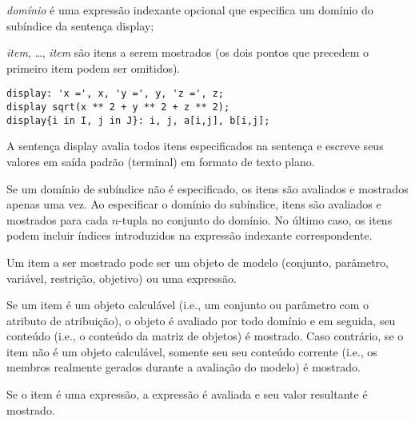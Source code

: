 \documentclass[11pt, brazil]{report}
\def\para#1{\noindent{\bf#1}}
\begin{document}
\medskip

\noindent
{\it domínio} é uma expressão indexante opcional que especifica
um domínio do subíndice da sentença display;

\noindent
{\it item}, \dots, {\it item} são itens a serem mostrados (os dois pontos
que precedem o primeiro item podem ser omitidos).

\para{Exemplos}

\begin{verbatim}
display: 'x =', x, 'y =', y, 'z =', z;
display sqrt(x ** 2 + y ** 2 + z ** 2);
display{i in I, j in J}: i, j, a[i,j], b[i,j];
\end{verbatim}

A sentença display avalia todos itens especificados na sentença
e escreve seus valores em saída padrão (terminal) em formato de
texto plano.

Se um domínio de subíndice não é especificado, os itens são avaliados e
mostrados apenas uma vez. Ao especificar o domínio do subíndice, itens
são avaliados e mostrados para cada $n$-tupla no conjunto do domínio. No
último caso, os itens podem incluir índices introduzidos na expressão
indexante correspondente.

Um item a ser mostrado pode ser um objeto de modelo (conjunto, parâmetro,
variável, restrição, objetivo) ou uma expressão.

Se um item é um objeto calculável (i.e., um conjunto ou parâmetro com
o atributo de atribuição), o objeto é avaliado por todo domínio
e em seguida, seu conteúdo (i.e., o conteúdo da matriz de objetos) é
mostrado. Caso contrário, se o item não é um objeto calculável, somente seu
seu conteúdo corrente (i.e., os membros realmente gerados durante a
avaliação do modelo) é mostrado.

Se o item é uma expressão, a expressão é avaliada e seu valor
resultante é mostrado.
\end{document}
